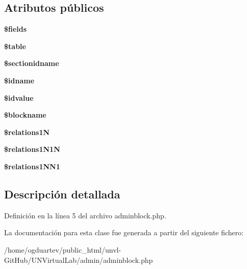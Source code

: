 \subsection*{Atributos públicos}
\begin{DoxyCompactItemize}
\item 
\mbox{\label{classadminblock_a86efd09cdc94c3fdaa3b5abbfc74fbef}} 
{\bfseries \$fields}
\item 
\mbox{\label{classadminblock_aff6ad656e948f5a333e940e59cc923b2}} 
{\bfseries \$table}
\item 
\mbox{\label{classadminblock_a65a19960858ea506655592cb1fc5bb0e}} 
{\bfseries \$sectionidname}
\item 
\mbox{\label{classadminblock_a61b563c0dfeec8a659713b5db1ac3b0b}} 
{\bfseries \$idname}
\item 
\mbox{\label{classadminblock_a193ac3c47d509ca1464480c73b7dac7b}} 
{\bfseries \$idvalue}
\item 
\mbox{\label{classadminblock_a114998a4cea5bc508c8787af12f525ed}} 
{\bfseries \$blockname}
\item 
\mbox{\label{classadminblock_a8aff2f80ea6041741f0aff93b5f86e3e}} 
{\bfseries \$relations1N}
\item 
\mbox{\label{classadminblock_a4da890b0eaa88cf3c3214ea4cb0c2d9c}} 
{\bfseries \$relations1\+N1N}
\item 
\mbox{\label{classadminblock_a92be1741e34afc7c85f574e557b4fca2}} 
{\bfseries \$relations1\+N\+N1}
\end{DoxyCompactItemize}


\subsection{Descripción detallada}


Definición en la línea 5 del archivo adminblock.\+php.



La documentación para esta clase fue generada a partir del siguiente fichero\+:\begin{DoxyCompactItemize}
\item 
/home/ogduartev/public\+\_\+html/unvl-\/\+Git\+Hub/\+U\+N\+Virtual\+Lab/admin/adminblock.\+php\end{DoxyCompactItemize}
